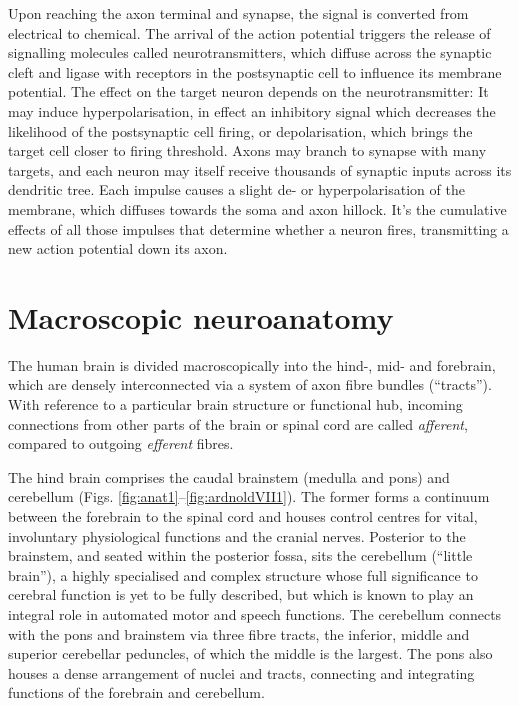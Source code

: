 Upon reaching the axon terminal and synapse, the signal is converted from electrical to chemical.
The arrival of the action potential triggers the release of signalling molecules called neurotransmitters, which diffuse across the synaptic cleft and ligase with receptors in the postsynaptic cell to influence its membrane potential.
The effect on the target neuron depends on the neurotransmitter:
It may induce hyperpolarisation, in effect an inhibitory signal which decreases the likelihood of the postsynaptic cell firing, or depolarisation, which brings the target cell closer to firing threshold.
Axons may branch to synapse with many targets, and each neuron may itself receive thousands of synaptic inputs across its dendritic tree.
Each impulse causes a slight de- or hyperpolarisation of the membrane, which diffuses towards the soma and axon hillock.
It's the cumulative effects of all those impulses that determine whether a neuron fires, transmitting a new action potential down its axon.

\section{Macroscopic neuroanatomy}

The human brain is divided macroscopically into the hind-, mid- and forebrain, which are densely interconnected via a system of axon fibre bundles (``tracts'').
With reference to a particular brain structure or functional hub, incoming connections from other parts of the brain or spinal cord are called \textit{afferent}, compared to outgoing \textit{efferent} fibres.

The hind brain comprises the caudal brainstem (medulla and pons) and cerebellum (Figs. \ref{fig:anat1}--\ref{fig:ardnoldVII1}).
The former forms a continuum between the forebrain to the spinal cord and houses control centres for vital, involuntary physiological functions and the cranial nerves.
Posterior to the brainstem, and seated within the posterior fossa, sits the cerebellum (``little brain''),
a highly specialised and complex structure whose full significance to cerebral function is yet to be fully described, but which is known to play an integral role in automated motor and speech functions.
The cerebellum connects with the pons and brainstem via three fibre tracts, the inferior, middle and superior cerebellar peduncles, of which the middle is the largest.
The pons also houses a dense arrangement of nuclei and tracts, connecting and integrating functions of the forebrain and cerebellum.

